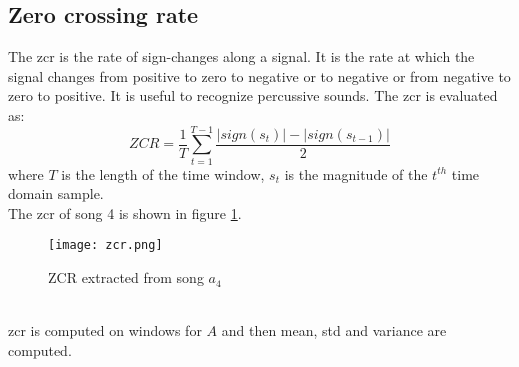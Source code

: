 \subsection{Zero crossing rate}
The \gls{zcr}  is the rate of sign-changes along a signal. It is the rate at which the signal changes from positive to zero to negative or to negative or from negative to zero to positive. It is useful to recognize percussive sounds.
The \gls{zcr} is evaluated as:
\begin{equation}
	ZCR=\dfrac{1}{T} \sum_{t=1}^{T-1}{\dfrac{|sign(s_t)|-|sign(s_{t-1})|}{2}}
\end{equation}
where $T$ is the length of the time window, $s_t$ is the magnitude of the $t^{th}$ time domain sample.
\\
The \gls{zcr} of song 4 is shown in figure \ref{fig:zcr}.
\begin{figure}[h]
    \centering
    \texttt{[image: zcr.png]} 
	\caption{ZCR extracted from song $a_4$}
    \label{fig:zcr}
\end{figure}
\\
\gls{zcr} is computed on windows for $A$ and then mean, std and variance are computed.

